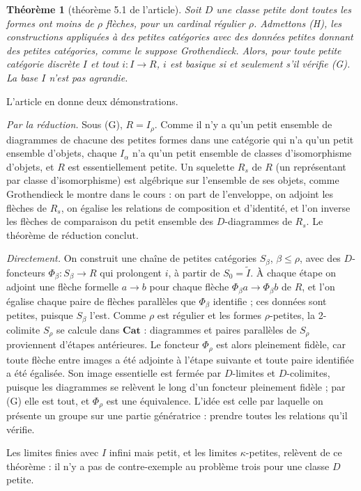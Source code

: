 \documentclass[11pt,a4paper]{amsart}
\theoremstyle{definition}
\theoremstyle{plain}
\newtheorem{theoreme}{Théorème}
\theoremstyle{remark}
\newcommand{\Cat}{\mathbf{Cat}}
\newcommand{\It}{\widetilde I}
\begin{document}
\begin{theoreme}[théorème 5.1 de l'article]
Soit $D$ une classe petite dont toutes les formes ont moins de $\rho$ flèches, pour un cardinal régulier $\rho$. Admettons (H), les constructions appliquées à des petites catégories avec des données petites donnant des petites catégories, comme le suppose Grothendieck. Alors, pour toute petite catégorie discrète $I$ et tout $i\colon I\to R$, $i$ est basique si et seulement s'il vérifie (G). La base $I$ n'est pas agrandie.
\end{theoreme}

L'article en donne deux démonstrations.

\emph{Par la réduction.} Sous (G), $R=I_\rho$. Comme il n'y a qu'un petit ensemble de diagrammes de chacune des petites formes dans une catégorie qui n'a qu'un petit ensemble d'objets, chaque $I_\alpha$ n'a qu'un petit ensemble de classes d'isomorphisme d'objets, et $R$ est essentiellement petite. Un squelette $R_s$ de $R$ (un représentant par classe d'isomorphisme) est algébrique sur l'ensemble de ses objets, comme Grothendieck le montre dans le cours : on part de l'enveloppe, on adjoint les flèches de $R_s$, on égalise les relations de composition et d'identité, et l'on inverse les flèches de comparaison du petit ensemble des $D$-diagrammes de $R_s$. Le théorème de réduction conclut.

\emph{Directement.} On construit une chaîne de petites catégories $S_\beta$, $\beta\le\rho$, avec des $D$-foncteurs $\Phi_\beta\colon S_\beta\to R$ qui prolongent $i$, à partir de $S_0=\It$. À chaque étape on adjoint une flèche formelle $a\to b$ pour chaque flèche $\Phi_\beta a\to\Phi_\beta b$ de $R$, et l'on égalise chaque paire de flèches parallèles que $\Phi_\beta$ identifie ; ces données sont petites, puisque $S_\beta$ l'est. Comme $\rho$ est régulier et les formes $\rho$-petites, la 2-colimite $S_\rho$ se calcule dans $\Cat$ : diagrammes et paires parallèles de $S_\rho$ proviennent d'étapes antérieures. Le foncteur $\Phi_\rho$ est alors pleinement fidèle, car toute flèche entre images a été adjointe à l'étape suivante et toute paire identifiée a été égalisée. Son image essentielle est fermée par $D$-limites et $D$-colimites, puisque les diagrammes se relèvent le long d'un foncteur pleinement fidèle ; par (G) elle est tout, et $\Phi_\rho$ est une équivalence. L'idée est celle par laquelle on présente un groupe sur une partie génératrice : prendre toutes les relations qu'il vérifie.

Les limites finies avec $I$ infini mais petit, et les limites $\kappa$-petites, relèvent de ce théorème : il n'y a pas de contre-exemple au problème trois pour une classe $D$ petite.
\end{document}
